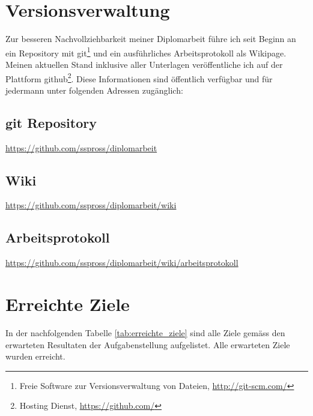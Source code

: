 \section{Versionsverwaltung}
Zur besseren Nachvollziehbarkeit meiner Diplomarbeit führe ich seit Beginn an
ein Repository mit git\footnote{Freie Software zur Versionsverwaltung von Dateien,
\url{http://git-scm.com/}} und ein ausführliches Arbeitsprotokoll als Wikipage.
Meinen aktuellen Stand inklusive aller Unterlagen veröffentliche ich auf der 
Plattform github\footnote{Hosting Dienst, \url{https://github.com/}}. Diese 
Informationen sind öffentlich verfügbar und für jedermann unter folgenden 
Adressen zugänglich:

\subsection{git Repository}
\url{https://github.com/sspross/diplomarbeit}

\subsection{Wiki}
\url{https://github.com/sspross/diplomarbeit/wiki}

\subsection{Arbeitsprotokoll}
\url{https://github.com/sspross/diplomarbeit/wiki/arbeitsprotokoll}

\section{Erreichte Ziele}
In der nachfolgenden Tabelle \ref{tab:erreichte_ziele} sind alle Ziele gemäss 
den erwarteten Resultaten der Aufgabenstellung aufgelistet. Alle 
erwarteten Ziele wurden erreicht.

